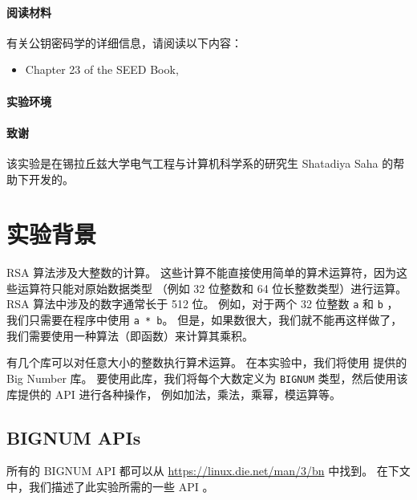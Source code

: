 \paragraph{阅读材料}
有关公钥密码学的详细信息，请阅读以下内容：

\begin{itemize}
\item Chapter 23 of the SEED Book, \seedbook
\end{itemize}

\paragraph{实验环境} \seedenvironmentB

\paragraph{致谢}
该实验是在锡拉丘兹大学电气工程与计算机科学系的研究生 Shatadiya Saha 的帮助下开发的。


\section{实验背景}

RSA 算法涉及大整数的计算。
这些计算不能直接使用简单的算术运算符，因为这些运算符只能对原始数据类型
（例如 32 位整数和 64 位长整数类型）进行运算。
RSA 算法中涉及的数字通常长于 512 位。
例如，对于两个 32 位整数 \texttt{a} 和 \texttt{b} ，
我们只需要在程序中使用 \texttt{a * b}。
但是，如果数很大，我们就不能再这样做了，我们需要使用一种算法（即函数）来计算其乘积。

有几个库可以对任意大小的整数执行算术运算。
在本实验中，我们将使用 \openssl 提供的 Big Number 库。
要使用此库，我们将每个大数定义为 \texttt{BIGNUM} 类型，然后使用该库提供的 API 进行各种操作，
例如加法，乘法，乘幂，模运算等。


\subsection{BIGNUM APIs}

所有的 BIGNUM API 都可以从 \url{https://linux.die.net/man/3/bn} 中找到。
在下文中，我们描述了此实验所需的一些 API 。


